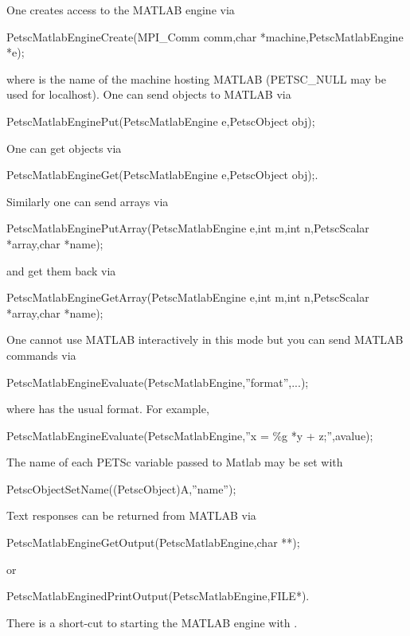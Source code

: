 One creates access to the MATLAB engine via 
\begin{tabbing}
  PetscMatlabEngineCreate(MPI\_Comm comm,char *machine,PetscMatlabEngine *e);
\end{tabbing}
where  is the name of the machine hosting MATLAB (PETSC_NULL may be used for localhost).
One can send objects to MATLAB via 
\begin{tabbing}
  PetscMatlabEnginePut(PetscMatlabEngine e,PetscObject obj);
\end{tabbing}
One can get objects
via 
\begin{tabbing}
  PetscMatlabEngineGet(PetscMatlabEngine e,PetscObject obj);.
\end{tabbing}
Similarly one can send arrays via
\begin{tabbing}
  PetscMatlabEnginePutArray(PetscMatlabEngine e,int m,int n,PetscScalar *array,char *name);
\end{tabbing}
and get them back via
\begin{tabbing}
  PetscMatlabEngineGetArray(PetscMatlabEngine e,int m,int n,PetscScalar *array,char *name);
\end{tabbing}
One cannot use MATLAB
interactively in this mode but you can send MATLAB commands via
\begin{tabbing}
  PetscMatlabEngineEvaluate(PetscMatlabEngine,''format'',...);
\end{tabbing}
where  has the usual  format.
For example,
\begin{tabbing}
  PetscMatlabEngineEvaluate(PetscMatlabEngine,''x = \%g *y + z;'',avalue);
\end{tabbing}
The name of each PETSc variable passed to Matlab may be set with
\begin{tabbing}
PetscObjectSetName((PetscObject)A,''name'');
\end{tabbing}

Text responses can be returned from MATLAB via 
\begin{tabbing}
  PetscMatlabEngineGetOutput(PetscMatlabEngine,char **); 
\end{tabbing}
or
\begin{tabbing}
PetscMatlabEnginedPrintOutput(PetscMatlabEngine,FILE*).
\end{tabbing}
There is a short-cut to starting the MATLAB engine
with .




\cleardoublepage
